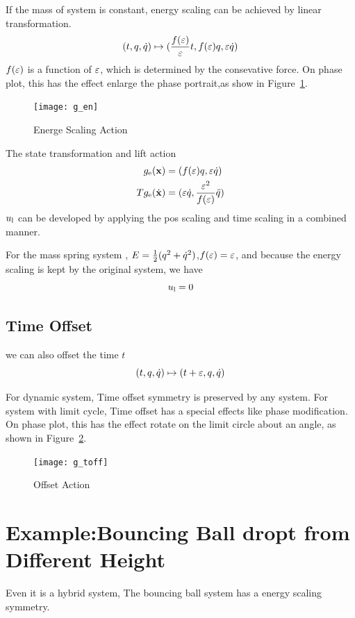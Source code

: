 If the mass of system is constant, energy scaling can be achieved by linear transformation.
\[
(t,q,\dot{q} ) \mapsto ( \frac{f(\varepsilon)}{\varepsilon}t ,f(\varepsilon)q,\varepsilon\dot{q})
\]
$f(\varepsilon)$ is a function of $\varepsilon$, which is determined by the consevative force.
On phase plot, this has the effect enlarge the phase portrait,as show in Figure~\ref{fig:gen}.
\begin{figure}[!htbp]
  \begin{center}
      \texttt{[image: g\_en]}
    \caption{Energe Scaling Action}
    \label{fig:gen}
\end{center}
\end{figure}

The state transformation and lift action
\begin{align}
g_{\mathrm{e}}(\mathbf{x})&=(f(\varepsilon) q,\varepsilon \dot{q}) \nonumber\\
Tg_{\mathrm{e}}(\dot{\mathbf{x}})&=(\varepsilon \dot{q},\frac{\varepsilon^2}{f(\varepsilon)}\ddot{q})
\end{align}
$u_{\mathrm{l}}$ can be developed by applying the pos scaling and time scaling in a combined manner.



For the mass spring system , $E=\frac{1}{2}(q^2+\dot{q}^2)$,$f(\varepsilon)=\varepsilon$, and because the energy scaling is kept by the original system, we have
\[
u_{\mathrm{l}}=0
\]



\subsection*{Time Offset}
we can also offset the time $t$
\[
(t,q,\dot{q}) \mapsto (t+\varepsilon,q,\dot{q})
\]

For dynamic system, Time offset symmetry is preserved by any system.
For system with limit cycle, Time offset has a special effects like phase modification.
On phase plot, this has the effect rotate on the limit circle about an angle, as shown in Figure~\ref{fig:gtoff}.
\begin{figure}
  \begin{center}
      \texttt{[image: g\_toff]}
    \caption{Offset Action}
    \label{fig:gtoff}
\end{center}
\end{figure}





\section{Example:Bouncing Ball dropt from Different Height}
Even it is a hybrid system,
The bouncing ball system has a energy scaling symmetry.

